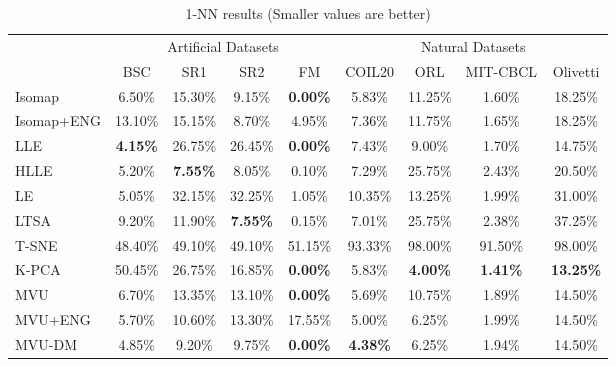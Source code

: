         \begin{table}[t]
        \caption{1-NN results (Smaller values are better)}
        \label{tab:1NN}
        \begin{center}
        \begin{tabular}{|l|c|c|c|c||c|c|c|c|}
        \hline
        \multicolumn{1}{|c|}{} & \multicolumn{4}{c||}{Artificial Datasets} & \multicolumn{4}{c|}{Natural Datasets} \\
                            & BSC & SR1 & SR2 & FM & COIL20 & ORL & MIT-CBCL & Olivetti \\
        \hline
        Isomap            & 6.50\% & 15.30\% & 9.15\% & \textbf{0.00\%} & 5.83\% & 11.25\% & 1.60\% & 18.25\% \\
        Isomap+ENG            & 13.10\% & 15.15\% & 8.70\% & 4.95\% & 7.36\% & 11.75\% & 1.65\% & 18.25\% \\
        LLE            & \textbf{4.15\%} & 26.75\% & 26.45\% & \textbf{0.00\%} & 7.43\% & 9.00\% & 1.70\% & 14.75\% \\
        HLLE            & 5.20\% & \textbf{7.55\%} & 8.05\% & 0.10\% & 7.29\% & 25.75\% & 2.43\% & 20.50\% \\
        LE            & 5.05\% & 32.15\% & 32.25\% & 1.05\% & 10.35\% & 13.25\% & 1.99\% & 31.00\% \\
        LTSA            & 9.20\% & 11.90\% & \textbf{7.55\%} & 0.15\% & 7.01\% & 25.75\% & 2.38\% & 37.25\% \\
        T-SNE            & 48.40\% & 49.10\% & 49.10\% & 51.15\% & 93.33\% & 98.00\% & 91.50\% & 98.00\% \\
        K-PCA            & 50.45\% & 26.75\% & 16.85\% & \textbf{0.00\%} & 5.83\% & \textbf{4.00\%} & \textbf{1.41\%} & \textbf{13.25\%} \\
        \hline
        MVU            & 6.70\% & 13.35\% & 13.10\% & \textbf{0.00\%} & 5.69\% & 10.75\% & 1.89\% & 14.50\% \\
        MVU+ENG            & 5.70\% & 10.60\% & 13.30\% & 17.55\% & 5.00\% & 6.25\% & 1.99\% & 14.50\% \\
        MVU-DM            & 4.85\% & 9.20\% & 9.75\% & \textbf{0.00\%} & \textbf{4.38\%} & 6.25\% & 1.94\% & 14.50\% \\
        \hline
        \end{tabular}
        \end{center}
        \end{table}

